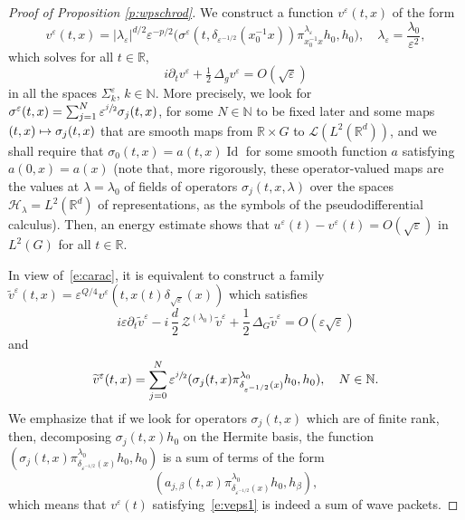 \documentclass[10pt]{amsart}
\let\mathcal\mathscr
\newcommand\mto{\mathchoice{\longmapsto}{\mapsto}{\mapsto}{\mapsto}}
\DeclareMathOperator{\Id}{Id}
\theoremstyle{plain}
\theoremstyle{definition}
\let\eps\varepsilon
\def\R{{\mathbb R}}
\def\N{{\mathbb N}}
\begin{document}
\begin{proof}[Proof of Proposition \ref{p:wpschrod}]
We construct a function $v^\eps(t,x)$
of the form
\begin{equation} \label{e:veps1}
v^\eps(t,x)= |\lambda_\eps|^{d/2} \eps^{-p/2} \bigl(\sigma^\eps(t,\delta_{\eps^{-1/2}}(x_0^{-1} x)) \pi^{\lambda_\eps}_{x_0^{-1} x} h_0,h_0\bigr),\quad \lambda_\eps=\frac{\lambda_0}{\eps^2},
\end{equation}
which
solves for all $t\in\R$,
\begin{equation*}%
i\partial_t v^\eps +\tfrac 12\, \Delta_g v^\eps= O(\sqrt\eps)
\end{equation*}
in all the spaces $\Sigma^\eps_k$, $k\in\N$.
More precisely, we look for $\sigma^\eps(t,x) =\sum_{j=1}^N\eps^{\sfrac{j}{2}}\sigma_j(t,x)$, for some $N\in\N$ to be fixed later and
some maps $(t,x)\mto \sigma_j(t,x) $ that are smooth maps from $\R\times G$ to $\mathcal L(L^2(\R^d))$, and we shall require that $\sigma_0(t,x)=a(t,x)\Id$ for some smooth function $a$ satisfying $a(0,x)=a(x)$
(note that, more rigorously, these operator-valued maps are the values at $\lambda=\lambda_0$ of fields of operators $\sigma_j(t,x,\lambda)$ over the spaces $\mathcal H_\lambda = L^2(\R^d)$ of representations, as the symbols of the pseudodifferential calculus).
Then, an energy estimate shows that $u^\eps(t)-v^\eps(t) =O(\sqrt\eps)$ in $L^2(G)$ for all $t\in \R$.

In view of~\eqref{e:carac}, it is equivalent to construct a family
$\widetilde v^\eps(t,x)\!=\!\eps^{Q/4} v^\eps(t,x(t) \delta_{\sqrt\eps}(x))$
which satisfies
\[
i\eps \partial_t \widetilde v^\eps -i\,\frac{d}{2}\, \mathcal Z^{(\lambda_0)} \widetilde v^\eps +\frac 12\, \Delta_G \widetilde v^\eps= O(\eps \sqrt\eps)
\]
and
\begin{equation*}%
\widetilde v^\eps (t,x)= \sum_{j=0}^N \eps^{\sfrac{j}{2}}
(\sigma_j(t,x)\pi^{\lambda_0}_{\delta_{\eps^{-1/2}}(x)}h_0,h_0), \quad N\in\N.
\end{equation*}
We emphasize that if we look for operators $\sigma_j(t,x)$ which are of finite rank, then, decomposing $\sigma_j(t,x) h_0$ on the Hermite basis, the function $(\sigma_j(t,x)\pi^{\lambda_0}_{\delta_{\eps^{-1/2}}(x)}h_0,h_0)$ is a sum of terms of the form
\[
(a_{j,\beta}(t,x)\pi^{\lambda_0}_{\delta_{\eps^{-1/2}}(x)}h_0,h_\beta),
\]
which means that $v^\eps(t)$ satisfying~\eqref{e:veps1} is indeed a sum of wave packets.


\end{proof}
\end{document}
